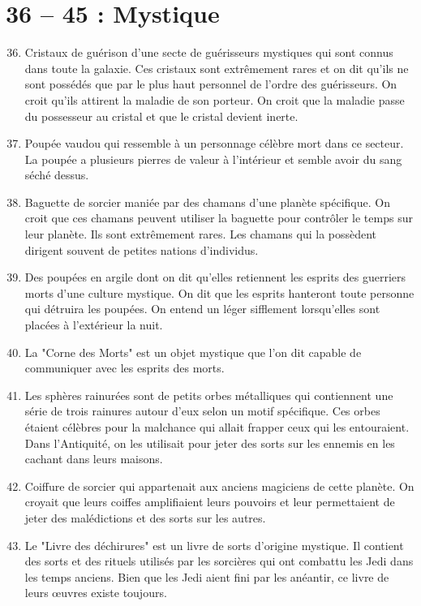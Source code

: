 \documentclass{article}
\begin{document}
\section*{36 -- 45 : Mystique}
\begin{enumerate}
	\setcounter{enumi}{35}
	\item Cristaux de guérison d'une secte de guérisseurs mystiques qui sont connus dans toute la galaxie. Ces cristaux sont extrêmement rares et on dit qu'ils ne sont possédés que par le plus haut personnel de l'ordre des guérisseurs. On croit qu'ils attirent la maladie de son porteur. On croit que la maladie passe du possesseur au cristal et que le cristal devient inerte.
	\item Poupée vaudou qui ressemble à un personnage célèbre mort dans ce secteur. La poupée a plusieurs pierres de valeur à l'intérieur et semble avoir du sang séché dessus.
	\item Baguette de sorcier maniée par des chamans d'une planète spécifique. On croit que ces chamans peuvent utiliser la baguette pour contrôler le temps sur leur planète. Ils sont extrêmement rares. Les chamans qui la possèdent dirigent souvent de petites nations d'individus.
	\item Des poupées en argile dont on dit qu'elles retiennent les esprits des guerriers morts d'une culture mystique. On dit que les esprits hanteront toute personne qui détruira les poupées. On entend un léger sifflement lorsqu'elles sont placées à l'extérieur la nuit.
	\item La "Corne des Morts" est un objet mystique que l'on dit capable de communiquer avec les esprits des morts.
	\item Les sphères rainurées sont de petits orbes métalliques qui contiennent une série de trois rainures autour d'eux selon un motif spécifique. Ces orbes étaient célèbres pour la malchance qui allait frapper ceux qui les entouraient. Dans l'Antiquité, on les utilisait pour jeter des sorts sur les ennemis en les cachant dans leurs maisons.
	\item Coiffure de sorcier qui appartenait aux anciens magiciens de cette planète. On croyait que leurs coiffes amplifiaient leurs pouvoirs et leur permettaient de jeter des malédictions et des sorts sur les autres.
	\item Le "Livre des déchirures" est un livre de sorts d'origine mystique. Il contient des sorts et des rituels utilisés par les sorcières qui ont combattu les Jedi dans les temps anciens. Bien que les Jedi aient fini par les anéantir, ce livre de leurs œuvres existe toujours.

\end{enumerate}
\end{document}
